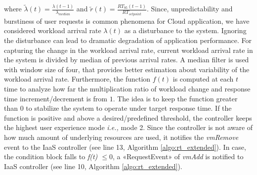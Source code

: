where \begin{math}\tilde{\lambda}(t) = \frac {\lambda(t-1)}
	{\lambda_{median}}\end{math} and \begin{math}\tilde{r}(t) =\frac
	{RT_{95}(t-1)} {RT_{setpoint}}\end{math}. Since,
unpredictability and burstiness of user requests is common phenomena for Cloud application, we have considered workload arrival rate $\lambda(t)$ as a disturbance to the system. Ignoring the disturbance can lead to dramatic degradation of application performance. For capturing the change in the workload
arrival rate, current workload arrival rate in the system is divided by median of
previous arrival rates. A median filter is used with window size of four, that provides better estimation about variability of the workload arrival rate. 
Furthermore, the function $f(t)$ is computed at each $t$ time to analyze how far the multiplication ratio of workload change and response time increment/decrement is from $1$. The idea is to keep the function greater than $0$ to stabilize
the system to operate under target response time. If the function is positive and above a desired/predefined threshold, the controller keeps the highest user experience mode \emph{i.e.,} mode 2. Since the controller is not aware of how much amount of underlying resources are used, it notifies the \emph{vmRemove} event to the IaaS controller (see line 13, Algorithm \ref{algo:rt_extended}). In case, the condition block falls to \emph{f(t) $\leq 0$}, a «RequestEvent» of \emph{vmAdd} is notified to IaaS controller (see line 10, Algorithm \ref{algo:rt_extended}).





